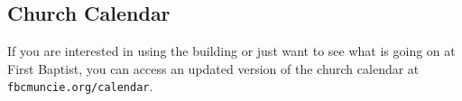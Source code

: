 \vspace{\fill}

\subsection{Church Calendar}
\label{church calendar}

If you are interested in using the building or just want to see what is going on at First Baptist, you can access an updated version of the church calendar at \texttt{fbcmuncie.org/calendar}.

\vspace{\fill}